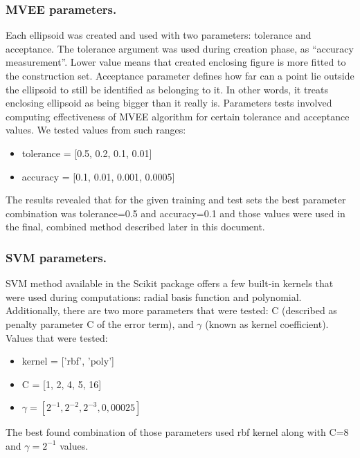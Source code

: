 \documentclass{llncs}
\begin{document}
\subsubsection{MVEE parameters.}
Each ellipsoid was created and used with two parameters: tolerance and acceptance. The tolerance argument was used during creation phase, as ``accuracy measurement''. Lower value means that created enclosing figure is more fitted to the construction set. Acceptance parameter defines how far can a point lie outside the ellipsoid to still be identified as belonging to it. In other words, it treats enclosing ellipsoid as being bigger than it really is. Parameters tests involved computing effectiveness of MVEE algorithm for certain tolerance and acceptance values. We tested values from such ranges:\vspace{-6pt}
\begin{itemize}
	\item tolerance = [0.5, 0.2, 0.1, 0.01]
	\item accuracy = [0.1, 0.01, 0.001, 0.0005]
\end{itemize} 
The results revealed that for the given training and test sets the best parameter combination was tolerance=0.5 and accuracy=0.1 and those values were used in the final, combined method described later in this document.

\vspace{-9pt}
\subsubsection{SVM parameters.}
SVM method available in the Scikit package offers a few built-in kernels that were used during computations: radial basis function and polynomial. Additionally, there are two more parameters that were tested: C (described as penalty parameter C of the error term), and $\gamma$ (known as kernel coefficient). Values that were tested:\vspace{-6pt}
\begin{itemize}
	\item kernel = ['rbf', 'poly']
	\item C = [1, 2, 4, 5, 16]
	\item $\gamma = [2^{-1}, 2^{-2}, 2^{-3}, 0,00025]$
\end{itemize}
The best found combination of those parameters used rbf kernel along with C=8 and $\gamma = 2^{-1}$ values.

\vspace{-9pt}
\end{document}

